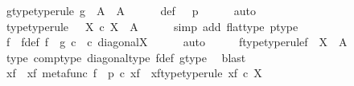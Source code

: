 \begin{isabellebody}
\ g{\isacharunderscore}{\kern0pt}type{\isacharbrackleft}{\kern0pt}type{\isacharunderscore}{\kern0pt}rule{\isacharbrackright}{\kern0pt}{\isacharcolon}{\kern0pt}\ {\isachardoublequoteopen}g\ {\isacharcolon}{\kern0pt}\ A\ {\isasymrightarrow}\ A{\isachardoublequoteclose}\isanewline
\ \ \isamarkupfalse%
\ {\isasymphi}\ \ {\isasymphi}{\isacharunderscore}{\kern0pt}def{\isacharcolon}{\kern0pt}\ {\isachardoublequoteopen}{\isasymphi}\ {\isacharequal}{\kern0pt}\ p\isactrlsup {\isasymflat}{\isachardoublequoteclose}\isanewline
\ \ \ \ \isamarkupfalse%
\ auto\isanewline
\ \ \isamarkupfalse%
\ \isamarkupfalse%
\ {\isasymphi}{\isacharunderscore}{\kern0pt}type{\isacharbrackleft}{\kern0pt}type{\isacharunderscore}{\kern0pt}rule{\isacharbrackright}{\kern0pt}{\isacharcolon}{\kern0pt}\ {\isachardoublequoteopen}{\isasymphi}\ {\isacharcolon}{\kern0pt}\ X\ {\isasymtimes}\isactrlsub c\ X\ {\isasymrightarrow}\ A{\isachardoublequoteclose}\isanewline
\ \ \ \ \isamarkupfalse%
\ {\isacharparenleft}{\kern0pt}simp\ add{\isacharcolon}{\kern0pt}\ flat{\isacharunderscore}{\kern0pt}type\ p{\isacharunderscore}{\kern0pt}type{\isacharparenright}{\kern0pt}\isanewline
\ \ \isamarkupfalse%
\ f\ \ f{\isacharunderscore}{\kern0pt}def{\isacharcolon}{\kern0pt}\ {\isachardoublequoteopen}f\ {\isacharequal}{\kern0pt}\ g\ {\isasymcirc}\isactrlsub c\ {\isasymphi}\ {\isasymcirc}\isactrlsub c\ diagonal{\isacharparenleft}{\kern0pt}X{\isacharparenright}{\kern0pt}{\isachardoublequoteclose}\isanewline
\ \ \ \ \isamarkupfalse%
\ auto\isanewline
\ \ \isamarkupfalse%
\ \isamarkupfalse%
\ f{\isacharunderscore}{\kern0pt}type{\isacharbrackleft}{\kern0pt}type{\isacharunderscore}{\kern0pt}rule{\isacharbrackright}{\kern0pt}{\isacharcolon}{\kern0pt}{\isachardoublequoteopen}f\ {\isacharcolon}{\kern0pt}\ X\ {\isasymrightarrow}\ A{\isachardoublequoteclose}\isanewline
\ \ \ \ \isamarkupfalse%
\ {\isasymphi}{\isacharunderscore}{\kern0pt}type\ comp{\isacharunderscore}{\kern0pt}type\ diagonal{\isacharunderscore}{\kern0pt}type\ f{\isacharunderscore}{\kern0pt}def\ g{\isacharunderscore}{\kern0pt}type\ \isamarkupfalse%
\ blast\isanewline
\ \ \isamarkupfalse%
\ x{\isacharunderscore}{\kern0pt}f\ \ x{\isacharunderscore}{\kern0pt}f{\isacharcolon}{\kern0pt}\ {\isachardoublequoteopen}metafunc\ f\ {\isacharequal}{\kern0pt}\ p\ {\isasymcirc}\isactrlsub c\ x{\isacharunderscore}{\kern0pt}f{\isachardoublequoteclose}\ \ x{\isacharunderscore}{\kern0pt}f{\isacharunderscore}{\kern0pt}type{\isacharbrackleft}{\kern0pt}type{\isacharunderscore}{\kern0pt}rule{\isacharbrackright}{\kern0pt}{\isacharcolon}{\kern0pt}\ {\isachardoublequoteopen}x{\isacharunderscore}{\kern0pt}f\ {\isasymin}\isactrlsub c\ X{\isachardoublequoteclose}\isanewline

\end{isabellebody}
